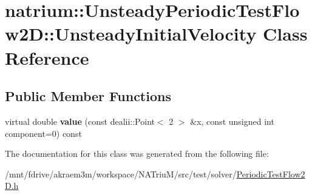\hypertarget{classnatrium_1_1UnsteadyPeriodicTestFlow2D_1_1UnsteadyInitialVelocity}{
\section{natrium::UnsteadyPeriodicTestFlow2D::UnsteadyInitialVelocity Class Reference}
\label{classnatrium_1_1UnsteadyPeriodicTestFlow2D_1_1UnsteadyInitialVelocity}
}
\subsection*{Public Member Functions}
\begin{DoxyCompactItemize}
\item 
\hypertarget{classnatrium_1_1UnsteadyPeriodicTestFlow2D_1_1UnsteadyInitialVelocity_a6d87029f1bd886c1244372a13229053d}{
virtual double {\bfseries value} (const dealii::Point$<$ 2 $>$ \&x, const unsigned int component=0) const }
\label{classnatrium_1_1UnsteadyPeriodicTestFlow2D_1_1UnsteadyInitialVelocity_a6d87029f1bd886c1244372a13229053d}

\end{DoxyCompactItemize}


The documentation for this class was generated from the following file:\begin{DoxyCompactItemize}
\item 
/mnt/fdrive/akraem3m/workspace/NATriuM/src/test/solver/\hyperlink{PeriodicTestFlow2D_8h}{PeriodicTestFlow2D.h}\end{DoxyCompactItemize}

